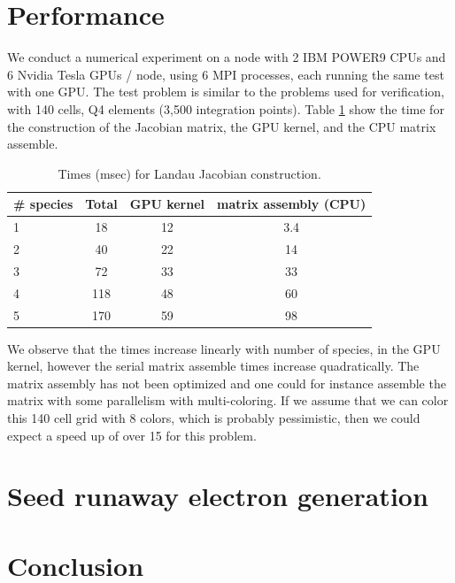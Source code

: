 \documentclass[12pt]{siamart}
\begin{document}
\section{Performance}
We conduct a numerical experiment on a node with 2 IBM POWER9 CPUs and 6 Nvidia Tesla GPUs / node, using 6 MPI processes, each running the same test with one GPU.
The test problem is similar to the problems used for verification, with 140 cells, Q4 elements (3,500 integration points).
Table \ref{tab:perf} show the time for the construction of the Jacobian matrix, the GPU kernel, and the CPU matrix assemble.
\begin{table}[!h]
   \centering
   \begin{tabular}{@{} lccc @{}} %
      \toprule
      \# species & Total & GPU kernel  & matrix assembly (CPU) \\
      \midrule
      1  &  18 &  12 & 3.4 \\
      2  & 40 &   22 &  14 \\
      3  &  72 &  33 &  33 \\
      4  & 118 &   48   & 60 \\
      5  & 170  &   59  &  98 \\
     \bottomrule
   \end{tabular}
   \caption{Times (msec) for Landau Jacobian construction.}
   \label{tab:perf}
\end{table}
We observe that the times increase linearly with number of species, in the GPU kernel, however the serial matrix assemble times increase quadratically.
The matrix assembly has not been optimized and one could for instance assemble the matrix with some parallelism with multi-coloring.
If we assume that we can color this 140 cell grid with 8 colors, which is probably pessimistic, then we could expect a speed up of over 15 for this problem.

\section{Seed runaway electron generation}

\section{Conclusion}
\end{document}
